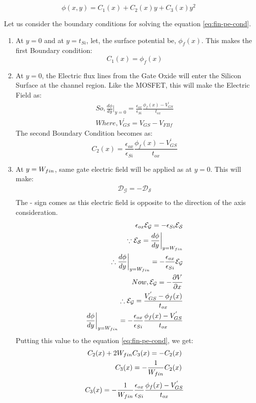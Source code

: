 \documentclass[a4paper]{article}
\begin{document}
\begin{equation}
  \label{eq:fin-pe-cond}
  \phi(x,y) = C_1(x) + C_2(x)y  + C_3(x)y^2
\end{equation}

Let us consider the boundary conditions for solving the equation \ref{eq:fin-pe-cond}.

\begin{enumerate}
\item At $y=0$ and at $y=t_{Si}$, let, the surface potential be, $\phi_f(x)$. This makes the first Boundary condition:
  \begin{equation}
    \label{eq:fin-cond-1}
    C_1(x)=\phi_f(x)
  \end{equation}
\item At $y=0$, the Electric flux lines from the Gate Oxide will enter the Silicon Surface at the channel region. Like the MOSFET, this will make the Electric Field as:
  \begin{align*}
    So, \frac{d\phi}{dy} \bigg\vert_{y=0} = \frac {\epsilon_{ox}} {\epsilon_{Si}} \frac{\phi_f(x) - V_{GS}^{'}}{t_{ox}}\\
    Where, V_{GS}^{'} = V_{GS} - V_{FBf}
  \end{align*}
  The second Boundary Condition becomes as:
  \begin{equation}
    \label{eq:fin-cond-2}
    C_2(x)=\frac {\epsilon_{ox}} {\epsilon_{Si}} \frac{\phi_f(x) - V_{GS}^{'}}{t_{ox}}
  \end{equation}
\item At $y=W_{fin}$, same gate electric field will be applied as at $y=0$. This will make:
  \begin{align*}
    \mathcal{D_{G}} = - \mathcal{D_{S}}\\
  \end{align*}
  The - sign comes as this electric field is opposite to the direction of the axis consideration.
  \begin{align*}
    \epsilon_{ox} \mathcal{E_{G}} = - \epsilon_{Si} \mathcal{E_{S}}\\
    \because \mathcal{E_{S}} = \frac{d\phi}{dy} \bigg\vert_{y=W_{fin}}\\
    \therefore \frac{d\phi}{dy} \bigg\vert_{y=W_{fin}} = - \frac {\epsilon_{ox}} {\epsilon_{Si}} \mathcal{E_{G}}\\
    Now, \mathcal{E_{G}} = - \frac{\partial V}{\partial x}\\
    \therefore \mathcal{E_{G}} = \frac{V_{GS}^{'} - \phi_f(x)}{t_{ox}}\\
    \frac{d\phi}{dy} \bigg\vert_{y=W_{fin}} = - \frac {\epsilon_{ox}} {\epsilon_{Si}} \frac{\phi_f(x) - V_{GS}^{'}}{t_{ox}}
  \end{align*}
  Putting this value to the equation \ref{eq:fin-pe-cond}, we get:
  \begin{align*}
    C_2(x) + 2W_{fin} C_3(x) = - C_2(x)\\
    C_3(x) = - \frac{1}{W_{fin}} C_2(x)
  \end{align*}
  \begin{equation}
    \label{eq:fin-cond-3}
    C_3(x) = - \frac{1}{W_{fin}} \frac {\epsilon_{ox}} {\epsilon_{Si}} \frac{\phi_f(x) - V_{GS}^{'}}{t_{ox}}
  \end{equation}
\end{enumerate}
\end{document}
